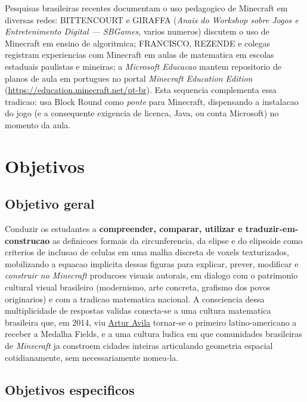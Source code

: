 \documentclass[12pt,a4paper]{scrartcl}
\newcommand{\acc}[1]{\textcolor{accent}{\textbf{#1}}}
\begin{document}
\begin{minec}
Pesquisas brasileiras recentes documentam o uso pedagogico de Minecraft em diversas redes: BITTENCOURT e GIRAFFA (\emph{Anais do Workshop sobre Jogos e Entretenimento Digital --- SBGames}, varios numeros) discutem o uso de Minecraft em ensino de algoritmica; FRANCISCO, REZENDE e colegas registram experiencias com Minecraft em aulas de matematica em escolas estaduais paulistas e mineiras; a \emph{Microsoft Educacao} mantem repositorio de planos de aula em portugues no portal \emph{Minecraft Education Edition} (\url{https://education.minecraft.net/pt-br}). Esta sequencia complementa essa tradicao: usa Block Round como \emph{ponte} para Minecraft, dispensando a instalacao do jogo (e a consequente exigencia de licenca, Java, ou conta Microsoft) no momento da aula.
\end{minec}

\section{Objetivos}\label{sec:objetivos}

\subsection{Objetivo geral}

Conduzir os estudantes a \acc{compreender, comparar, utilizar e traduzir-em-construcao} as definicoes formais da circunferencia, da elipse e do elipsoide como criterios de inclusao de celulas em uma malha discreta de voxels texturizados, mobilizando a equacao implicita dessas figuras para explicar, prever, modificar e \emph{construir no Minecraft} producoes visuais autorais, em dialogo com o patrimonio cultural visual brasileiro (modernismo, arte concreta, grafismo dos povos originarios) e com a tradicao matematica nacional. A consciencia dessa multiplicidade de respostas validas conecta-se a uma cultura matematica brasileira que, em 2014, viu \hyperref[sec:obmep]{Artur Avila} tornar-se o primeiro latino-americano a receber a Medalha Fields, e a uma cultura ludica em que comunidades brasileiras de \emph{Minecraft} ja constroem cidades inteiras articulando geometria espacial cotidianamente, sem necessariamente nomea-la.

\subsection{Objetivos especificos}
\end{document}
